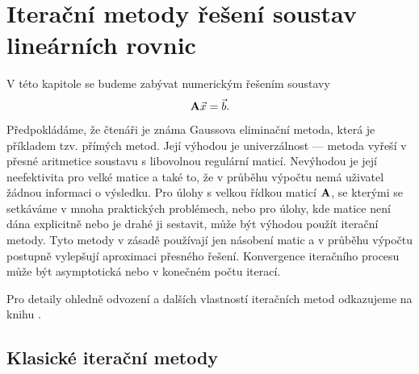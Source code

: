 \section{Iterační metody řešení soustav lineárních rovnic}

V této kapitole se budeme zabývat numerickým řešením soustavy
$$ \mathbf{A}\vec{x}=\vec{b}. $$
Předpokládáme, že čtenáři je známa Gaussova eliminační metoda, která je pří\-kla\-dem tzv. přímých metod.
Její výhodou je univerzálnost --- metoda vyřeší v přesné aritmetice soustavu s libovolnou regulární maticí.
Nevýhodou je její neefektivita pro velké matice a také to, že v průběhu výpočtu nemá uživatel žádnou informaci o výsledku.
Pro úlohy s velkou řídkou maticí $\mathbf{A}$, se kterými se setkáváme v mnoha praktických problémech, nebo pro úlohy, kde matice není dána explicitně nebo je drahé ji sestavit, může být výhodou použít iterační metody.
Tyto metody v zásadě používají jen násobení matic a v průběhu výpočtu postupně vylepšují aproximaci přesného řešení.
Konvergence iteračního procesu může být asymptotická nebo v konečném počtu iterací.

Pro detaily ohledně odvození a dalších vlastností iteračních metod odkazujeme na knihu \cite{analyza_metod_maticove_vyp}.



\subsection{Klasické iterační metody}


